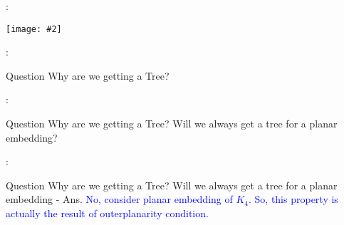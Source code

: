 \documentclass{beamer}
\newcommand{\iph}[2]{
    \texttt{[image: \#2]}
}
\begin{document}
\begin{frame}{\secname : \subsecname}
        \iph{0.9}{lin1}

\end{frame}

\begin{frame}{\secname : \subsecname}
    \begin{block}{Question}
        Why are we getting a Tree? 
    \end{block}

\end{frame}

\begin{frame}{\secname : \subsecname}
    \begin{block}{Question}
        Why are we getting a Tree? Will we always get a tree for a planar embedding?
    \end{block}

\end{frame}

\begin{frame}{\secname : \subsecname}
    \begin{block}{Question}
        Why are we getting a Tree? Will we always get a tree for a planar embedding - Ans. \textcolor{blue}{No, consider planar embedding of $K_4$. So, this property is actually the result of outerplanarity condition.}
    \end{block}

\end{frame}
\end{document}
